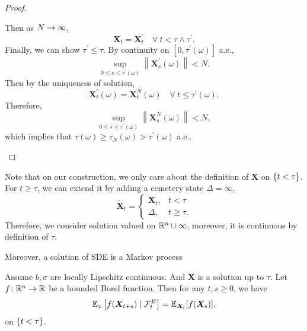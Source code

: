\begin{proof}
\begin{itemize}
        Then as $N \rightarrow \infty$,
        \begin{equation*}
            \bm{X}_t=\bm{X}_t^{\prime} \quad \forall~ t<\tau \wedge \tau^{\prime}.
        \end{equation*}
        Finally, we can show $\tau^{\prime} \leq \tau$. By continuity on $[0,\tau^\prime(\omega)]$ a.e.,
        \begin{equation*}
            \sup _{0 \leq s \leq \tau^{\prime}(\omega)}\left\|\bm{X}_s^{\prime}(\omega)\right\|<N .
        \end{equation*}
        Then by the uniqueness of solution,
        \begin{equation*}
            \bm{X}_t^{\prime}(\omega)=\bm{X}_t^N(\omega) \quad \forall~ t \leq \tau^{\prime}(\omega) .
        \end{equation*}
        Therefore,
        \begin{equation*}
            \sup _{0 \leq s \leq \tau^{\prime}(\omega)}\left\|\bm{X}_s^N(\omega)\right\|<N,
        \end{equation*}
        which implies that $ \tau(\omega) \geq \tau_N(\omega) > \tau^\prime(\omega)$ a.e.. \qedhere
    \end{itemize}
\end{proof}
\begin{rmk}
    Note that on our construction, we only care about the definition of $\bm{X}$ on $\left\{t < \tau\right\}$. For $t \geq \tau$, we can extend it by adding a cemetery state $\Delta = \infty$,
    \begin{equation*}
        \tilde{\bm{X}}_t = \begin{cases}
            \bm{X}_t,& t < \tau \\
            \Delta,& t \geq \tau.
        \end{cases}
    \end{equation*}
    Therefore, we consider solution valued on $\mathbb{R}^n \cup {\infty}$, moreover, it is continuous by definition of $\tau$.
\end{rmk}

Moreover, a solution of SDE is a Markov process

\begin{thm}
    Assume $b,\sigma$ are locally Lipschitz continuous. And $\bm{X}$ is a solution up to $\tau$. Let $f \colon \mathbb{R}^n \rightarrow \mathbb{R}$ be a bounded Borel function. Then for any $t,s \geq 0$, we have
    \begin{equation*}
        \mathbb{E}_x\left[f(\bm{X}_{t+s}) \mid \mathcal{F}^B_t\right] = \mathbb{E}_{\bm{X}_t}[f(\bm{X}_s)],
    \end{equation*}
    on $\left\{t < \tau\right\}$.
\end{thm}

